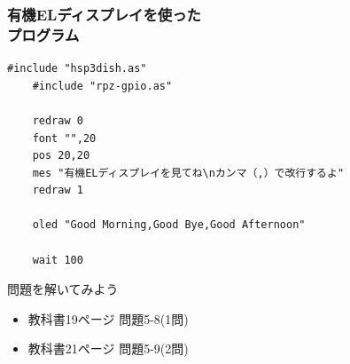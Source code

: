 \begin{frame}[fragile]
    \frametitle{有機ELディスプレイを使った\\プログラム}
    \begin{lstlisting}[title=\textasciitilde/05/oled.hsp]
    #include "hsp3dish.as"
    #include "rpz-gpio.as"

    redraw 0
    font "",20
    pos 20,20
    mes "有機ELディスプレイを見てね\nカンマ（,）で改行するよ"
    redraw 1

    oled "Good Morning,Good Bye,Good Afternoon"

    wait 100
    \end{lstlisting}
\end{frame}

\begin{frame}[fragile]
    \begin{exampleblock}{問題を解いてみよう}
    \begin{itemize}
        \item 教科書19ページ 問題5-8(1問)
        \item 教科書21ページ 問題5-9(2問)
    \end{itemize}
    \end{exampleblock}
\end{frame}